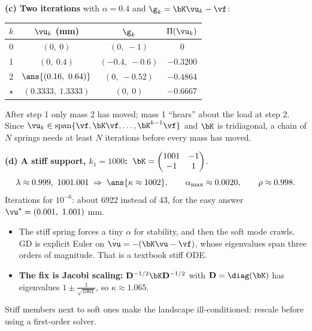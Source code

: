 \begin{frame}{}
  \textbf{(c) Two iterations} with $\alpha = 0.4$ and $\g_k = \bK\vu_k - \vf$:

  \vspace{2pt}
  \centering
  \begin{tabular}{@{}c c c c@{}}
    \toprule
    $k$ & $\vu_k$ (mm) & $\g_k$ & $\Pi(\vu_k)$ \\
    \midrule
    0 & $(0,\ 0)$ & $(0,\ -1)$ & $0$ \\
    1 & $(0,\ 0.4)$ & $(-0.4,\ -0.6)$ & $-0.3200$ \\
    2 & $\ans{(0.16,\ 0.64)}$ & $(0,\ -0.52)$ & $-0.4864$ \\
    $\star$ & $(0.3333,\ 1.3333)$ & $(0,\ 0)$ & $-0.6667$ \\
    \bottomrule
  \end{tabular}

  \raggedright
  \begin{keybox}
    After step 1 only mass 2 has moved; mass 1 ``hears'' about the load at step 2. Since
    $\vu_k \in \operatorname{span}\{\vf,\bK\vf,\dots,\bK^{k-1}\vf\}$ and $\bK$ is tridiagonal, a chain of $N$ springs
    needs at least $N$ iterations before every mass has moved.
  \end{keybox}
\end{frame}

\begin{frame}{}
  \textbf{(d) A stiff support, $k_1 = 1000$:} $\;\bK = \begin{pmatrix}1001 & -1\\ -1 & 1\end{pmatrix}$.
  \vspace{-4pt}
  \[
    \lambda \approx 0.999,\ 1001.001 \;\Rightarrow\; \ans{\kappa \approx 1002},\qquad
    \alpha_{\max} \approx 0.0020,\qquad \rho \approx 0.998 .
  \]
  \vspace{-6pt}
  Iterations for $10^{-6}$: \alert{about 6922} instead of 43, for the easy answer $\vu^\star = (0.001,\ 1.001)$ mm.
  \begin{itemize}\footnotesize
    \item The stiff spring forces a tiny $\alpha$ for stability, and then the soft mode crawls. GD is explicit Euler on
          $\dot\vu = -(\bK\vu - \vf)$, whose eigenvalues span three orders of magnitude. That is a textbook \alert{stiff ODE}.
    \item \textbf{The fix is Jacobi scaling:} $\mathbf D^{-1/2}\bK\mathbf D^{-1/2}$ with $\mathbf D = \diag(\bK)$ has
          eigenvalues $1\pm\tfrac1{\sqrt{1001}}$, so $\kappa \approx 1.065$.
  \end{itemize}
  \begin{keybox}
    Stiff members next to soft ones make the landscape ill-conditioned: rescale before using a first-order solver.
  \end{keybox}
\end{frame}
